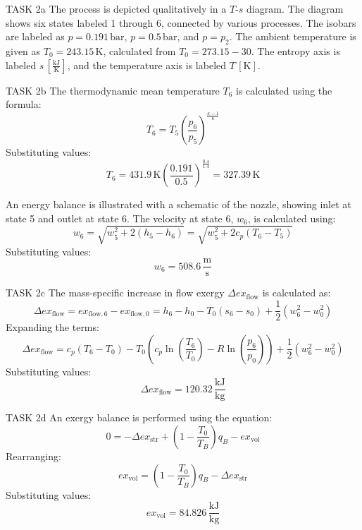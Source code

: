 TASK 2a  
The process is depicted qualitatively in a \( T \)-\( s \) diagram. The diagram shows six states labeled 1 through 6, connected by various processes. The isobars are labeled as \( p = 0.191 \, \text{bar} \), \( p = 0.5 \, \text{bar} \), and \( p = p_2 \). The ambient temperature is given as \( T_0 = 243.15 \, \text{K} \), calculated from \( T_0 = 273.15 - 30 \). The entropy axis is labeled \( s \, [\frac{\text{kJ}}{\text{K}}] \), and the temperature axis is labeled \( T \, [\text{K}] \).  

TASK 2b  
The thermodynamic mean temperature \( T_6 \) is calculated using the formula:  
\[
T_6 = T_5 \left( \frac{p_6}{p_5} \right)^{\frac{\kappa - 1}{\kappa}}
\]  
Substituting values:  
\[
T_6 = 431.9 \, \text{K} \left( \frac{0.191}{0.5} \right)^{\frac{0.4}{1.4}} = 327.39 \, \text{K}
\]  

An energy balance is illustrated with a schematic of the nozzle, showing inlet at state 5 and outlet at state 6. The velocity at state 6, \( w_6 \), is calculated using:  
\[
w_6 = \sqrt{w_5^2 + 2 \left( h_5 - h_6 \right)} = \sqrt{w_5^2 + 2 c_p \left( T_6 - T_5 \right)}
\]  
Substituting values:  
\[
w_6 = 508.6 \, \frac{\text{m}}{\text{s}}
\]  

TASK 2c  
The mass-specific increase in flow exergy \( \Delta ex_{\text{flow}} \) is calculated as:  
\[
\Delta ex_{\text{flow}} = ex_{\text{flow},6} - ex_{\text{flow},0} = h_6 - h_0 - T_0 \left( s_6 - s_0 \right) + \frac{1}{2} \left( w_6^2 - w_0^2 \right)
\]  
Expanding the terms:  
\[
\Delta ex_{\text{flow}} = c_p \left( T_6 - T_0 \right) - T_0 \left( c_p \ln \left( \frac{T_6}{T_0} \right) - R \ln \left( \frac{p_6}{p_0} \right) \right) + \frac{1}{2} \left( w_6^2 - w_0^2 \right)
\]  
Substituting values:  
\[
\Delta ex_{\text{flow}} = 120.32 \, \frac{\text{kJ}}{\text{kg}}
\]  

TASK 2d  
An exergy balance is performed using the equation:  
\[
0 = -\Delta ex_{\text{str}} + \left( 1 - \frac{T_0}{T_B} \right) q_B - ex_{\text{vol}}
\]  
Rearranging:  
\[
ex_{\text{vol}} = \left( 1 - \frac{T_0}{T_B} \right) q_B - \Delta ex_{\text{str}}
\]  
Substituting values:  
\[
ex_{\text{vol}} = 84.826 \, \frac{\text{kJ}}{\text{kg}}
\]